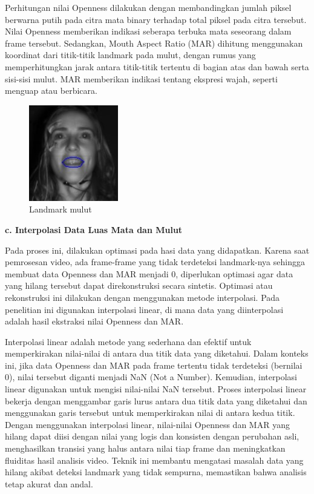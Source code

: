 \begin{enumerate}
Perhitungan nilai Openness dilakukan dengan membandingkan jumlah piksel berwarna putih pada citra mata binary terhadap total piksel pada citra tersebut. Nilai Openness memberikan indikasi seberapa terbuka mata seseorang dalam frame tersebut. Sedangkan, Mouth Aspect Ratio (MAR) dihitung menggunakan koordinat dari titik-titik landmark pada mulut, dengan rumus yang memperhitungkan jarak antara titik-titik tertentu di bagian atas dan bawah serta sisi-sisi mulut. MAR memberikan indikasi tentang ekspresi wajah, seperti menguap atau berbicara.

\begin{figure} [H] \centering
  \includegraphics[scale=1.65]{gambar/mouth.jpg}
  \caption{Landmark mulut}
  \label{fig:Landmarkmulut}
\end{figure}

  \textbf{c. Interpolasi Data Luas Mata dan Mulut}

Pada proses ini, dilakukan optimasi pada hasi data yang didapatkan. Karena saat pemrosesan video, ada frame-frame yang tidak terdeteksi landmark-nya sehingga membuat data Openness dan MAR menjadi 0, diperlukan optimasi agar data yang hilang tersebut dapat direkonstruksi secara sintetis. Optimasi atau rekonstruksi ini dilakukan dengan menggunakan metode interpolasi. Pada penelitian ini digunakan interpolasi linear, di mana data yang diinterpolasi adalah hasil ekstraksi nilai Openness dan MAR.

Interpolasi linear adalah metode yang sederhana dan efektif untuk memperkirakan nilai-nilai di antara dua titik data yang diketahui. Dalam konteks ini, jika data Openness dan MAR pada frame tertentu tidak terdeteksi (bernilai 0), nilai tersebut diganti menjadi NaN (Not a Number). Kemudian, interpolasi linear digunakan untuk mengisi nilai-nilai NaN tersebut. Proses interpolasi linear bekerja dengan menggambar garis lurus antara dua titik data yang diketahui dan menggunakan garis tersebut untuk memperkirakan nilai di antara kedua titik. Dengan menggunakan interpolasi linear, nilai-nilai Openness dan MAR yang hilang dapat diisi dengan nilai yang logis dan konsisten dengan perubahan asli, menghasilkan transisi yang halus antara nilai tiap frame dan meningkatkan fluiditas hasil analisis video. Teknik ini membantu mengatasi masalah data yang hilang akibat deteksi landmark yang tidak sempurna, memastikan bahwa analisis tetap akurat dan andal.
\end{enumerate}


